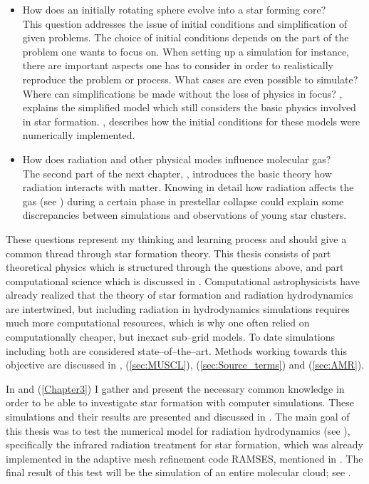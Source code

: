 \begin{itemize}
  \item How does an initially rotating sphere evolve into a star forming core? \\[3pt]
        This question addresses the issue of initial conditions and simplification of given problems.
        The choice of initial conditions depends on the part of the problem one wants to focus on.
        When setting up a simulation for instance, there are important aspects one has to consider in order to realistically reproduce the problem or process.
        What cases are even possible to simulate? Where can simplifications be made without the loss of physics in focus?
        , explains the simplified model which still considers the basic physics involved in star formation.
        , describes how the initial conditions for these models were numerically implemented. \\[-9pt]

  \item How does radiation and other physical modes influence molecular gas? \\[3pt]
        The second part of the next chapter, , introduces the basic theory how radiation interacts with matter.
        Knowing in detail how radiation affects the gas (see ) during a certain phase in prestellar collapse could explain some discrepancies between simulations and observations of young star clusters. \\[-6pt]
\end{itemize}

These questions represent my thinking and learning process and should give a common thread through star formation theory.
This thesis consists of part theoretical physics which is structured through the questions above, and part computational science which is discussed in .
Computational astrophysicists have already realized that the theory of star formation and radiation hydrodynamics are intertwined, but including radiation in hydrodynamics simulations requires much more computational resources, which is why one often relied on computationally cheaper, but inexact sub--grid models.
To date simulations including both are considered state--of--the--art.
Methods working towards this objective are discussed in , (\ref{sec:MUSCL}), (\ref{sec:Source_terms}) and (\ref{sec:AMR}).

In  and (\ref{Chapter3}) I gather and present the necessary common knowledge in order to be able to investigate star formation with computer simulations.
These simulations and their results are presented and discussed in .
The main goal of this thesis was to test the numerical model for radiation hydrodynamics (see ), specifically the infrared radiation treatment for star formation, which was already implemented in the adaptive mesh refinement code RAMSES, mentioned in .
The final result of this test will be the simulation of an entire molecular cloud; see .
